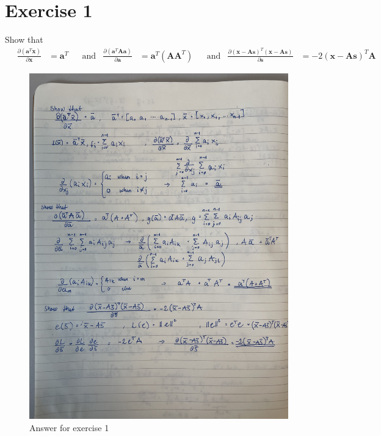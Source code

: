 \section{Exercise 1}\label{sec:ex1}
Show that 
\begin{align*}
    \quad \frac{\partial (\mathbf{a}^{T}\mathbf{x})}{\partial \mathbf{x}} &= \mathbf{a}^{T} && \text{and} & \frac{\partial (\mathbf{a}^{T} \mathbf{A} \mathbf{a})}{\partial \mathbf{a}} &= \mathbf{a}^{T} (\mathbf{A} \mathbf{A}^{T}) && \text{and} & \frac{\partial (\mathbf{x} - \mathbf{A} \mathbf{s})^{T} (\mathbf{x} - \mathbf{A} \mathbf{s})}{\partial \mathbf{s}} &= -2 (\mathbf{x} - \mathbf{A} \mathbf{s})^{T} \mathbf{A}
\end{align*}

\begin{figure}
    \centering
    \includegraphics[width=0.8\linewidth, angle=270]{latex/figures/ex1.jpeg}
    \caption{Answer for exercise 1}
    \label{fig:ex1}
\end{figure}